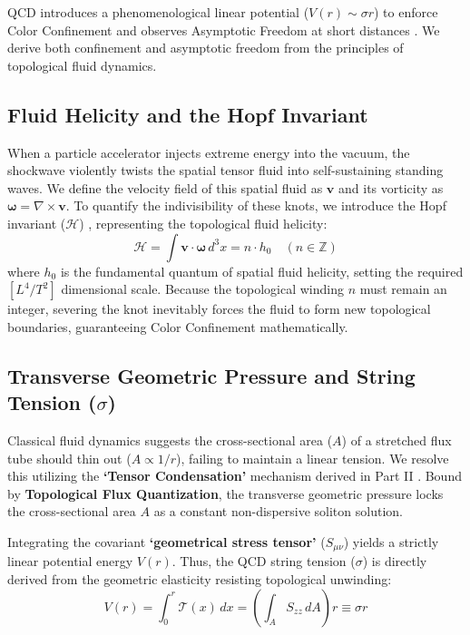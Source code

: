 \documentclass[reprint,amsmath,amssymb,aps,prd]{revtex4-2}
\begin{document}
QCD introduces a phenomenological linear potential ($V(r) \sim \sigma r$) to enforce Color Confinement and observes Asymptotic Freedom at short distances \cite{Gross1973}. We derive both confinement and asymptotic freedom from the principles of topological fluid dynamics.

\subsection{Fluid Helicity and the Hopf Invariant}
When a particle accelerator injects extreme energy into the vacuum, the shockwave violently twists the spatial tensor fluid into self-sustaining standing waves. We define the velocity field of this spatial fluid as $\mathbf{v}$ and its vorticity as $\boldsymbol{\omega} = \nabla \times \mathbf{v}$. To quantify the indivisibility of these knots, we introduce the Hopf invariant ($\mathcal{H}$) \cite{Moffatt1969}, representing the topological fluid helicity:
\begin{equation}
\mathcal{H} = \int \mathbf{v} \cdot \boldsymbol{\omega} \, d^3x = n \cdot h_0 \quad (n \in \mathbb{Z})
\end{equation}
where $h_0$ is the fundamental quantum of spatial fluid helicity, setting the required $[L^4/T^2]$ dimensional scale. Because the topological winding $n$ must remain an integer, severing the knot inevitably forces the fluid to form new topological boundaries, guaranteeing Color Confinement mathematically.

\subsection{Transverse Geometric Pressure and String Tension ($\sigma$)}
Classical fluid dynamics suggests the cross-sectional area ($A$) of a stretched flux tube should thin out ($A \propto 1/r$), failing to maintain a linear tension. We resolve this utilizing the \textbf{`Tensor Condensation'} mechanism derived in Part II \cite{YooPart2}. Bound by \textbf{Topological Flux Quantization}, the transverse geometric pressure locks the cross-sectional area $A$ as a constant non-dispersive soliton solution.

Integrating the covariant \textbf{`geometrical stress tensor'} ($S_{\mu\nu}$) yields a strictly linear potential energy $V(r)$. Thus, the QCD string tension ($\sigma$) \cite{Wilson1974} is directly derived from the geometric elasticity resisting topological unwinding:
\begin{equation}
V(r) = \int_{0}^{r} \mathcal{T}(x) \, dx = \left( \int_A S_{zz} \, dA \right) r \equiv \sigma r
\end{equation}
\end{document}
